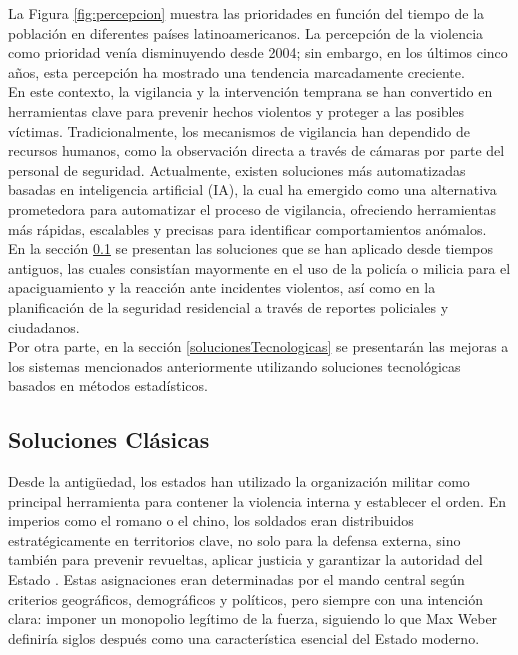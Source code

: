 La Figura \ref{fig:percepcion} muestra las prioridades en función 
del tiempo de la población en diferentes países latinoamericanos. 
La percepción de la violencia como prioridad venía disminuyendo 
desde 2004; sin embargo, en los últimos cinco años, esta 
percepción ha mostrado una tendencia marcadamente creciente.\\

En este contexto, la vigilancia y la intervención temprana se 
han convertido en herramientas clave para prevenir hechos 
violentos y proteger a las posibles víctimas. 
Tradicionalmente, los mecanismos de vigilancia han dependido 
de recursos humanos, como la observación directa a través de 
cámaras por parte del personal de seguridad. Actualmente, 
existen soluciones más automatizadas basadas en inteligencia 
artificial (IA), la cual ha emergido como una alternativa 
prometedora para automatizar el proceso de vigilancia, 
ofreciendo herramientas más rápidas, escalables y precisas 
para identificar comportamientos anómalos.\\

En la sección \ref{solucionesClásicas} se presentan las 
soluciones que se han aplicado desde tiempos antiguos, 
las cuales consistían mayormente en el uso de la policía 
o milicia para el apaciguamiento y la reacción ante 
incidentes violentos, así como en la planificación de la 
seguridad residencial a través de reportes policiales 
y ciudadanos. \\

Por otra parte, en la sección \ref{solucionesTecnologicas} se 
presentarán las mejoras a los sistemas mencionados anteriormente 
utilizando soluciones tecnológicas basados en métodos estadísticos.

\subsection{Soluciones Clásicas}\label{solucionesClásicas}

Desde la antigüedad, los estados han utilizado la organización 
militar como principal herramienta para contener la violencia 
interna y establecer el orden. En imperios como el romano o 
el chino, los soldados eran distribuidos estratégicamente en 
territorios clave, no solo para la defensa externa, sino 
también para prevenir revueltas, aplicar justicia y garantizar 
la autoridad del Estado \cite{Gilliver2005}. Estas asignaciones 
eran determinadas por el mando central según criterios 
geográficos, demográficos y políticos, pero siempre con una 
intención clara: imponer un monopolio legítimo de la fuerza, 
siguiendo lo que Max Weber definiría siglos después como una 
característica esencial del Estado moderno.\\

